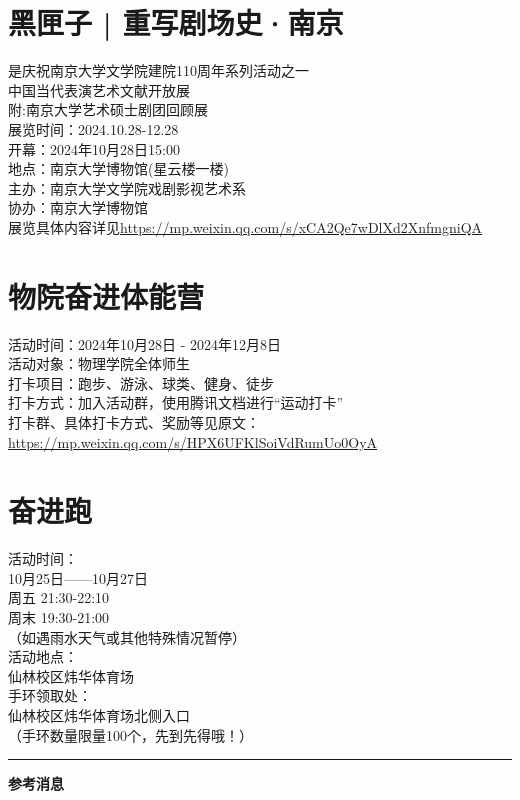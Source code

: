 \documentclass[letterpaper, 12pt]{article}
\begin{document}
\begin{multicols}{2}
\section{黑匣子 | 重写剧场史·南京}
是庆祝南京大学文学院建院110周年系列活动之一\\
中国当代表演艺术文献开放展\\
附:南京大学艺术硕士剧团回顾展\\
展览时间：2024.10.28-12.28\\
开幕：2024年10月28日15:00\\
地点：南京大学博物馆(星云楼一楼)\\
主办：南京大学文学院戏剧影视艺术系\\
协办：南京大学博物馆\\
展览具体内容详见\url{https://mp.weixin.qq.com/s/xCA2Qe7wDlXd2XnfmgniQA}

\section{物院奋进体能营}
活动时间：2024年10月28日 - 2024年12月8日\\
活动对象：物理学院全体师生\\
打卡项目：跑步、游泳、球类、健身、徒步\\
打卡方式：加入活动群，使用腾讯文档进行“运动打卡”\\
打卡群、具体打卡方式、奖励等见原文：\url{https://mp.weixin.qq.com/s/HPX6UFKlSoiVdRumUo0OyA}

\section{奋进跑}
活动时间：\\
10月25日——10月27日 \\
周五 21:30-22:10\\
周末 19:30-21:00\\
（如遇雨水天气或其他特殊情况暂停）\\
活动地点：\\
仙林校区炜华体育场\\
手环领取处：\\
仙林校区炜华体育场北侧入口\\
（手环数量限量100个，先到先得哦！）\\
\end{multicols}
\hrule
\vspace{4mm}
\centerline{\huge\textbf{参考消息}}
\end{document}
